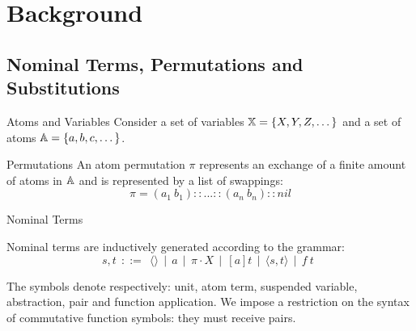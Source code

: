 \section{Background}
\subsection{Nominal Terms, Permutations and Substitutions}
\begin{frame}{Atoms and Variables} 
    Consider a set of variables $\mathbb{X} = \{X, Y, Z, \dots \}$ and 
    a set of atoms $\mathbb{A} = \{a, b, c, \dots \}$.
\end{frame}

\begin{frame}{Permutations}
    An atom permutation $\pi$ represents an exchange of a finite amount of atoms in
    $\mathbb{A}$
    and is represented by a list of swappings: 
\begin{equation*}
    \pi = (a_1 \ b_1):: ... ::(a_n \ b_n)::nil 
\end{equation*}
\end{frame}

\begin{frame}{Nominal Terms}
    \begin{definition}
    Nominal terms are inductively generated according to the grammar: 
    \begin{equation*}
        s,t \ \ ::= \ \ \langle \rangle \ \ | \ \ a \ \ | \ \ \pi \cdot X \ \ | \ \ [a]t \ \ |
                    \ \ \langle s, t \rangle \ \       | \ \ f \ t \ \   
    \end{equation*}
    \end{definition}
    The symbols denote respectively: unit, atom term, suspended variable,
    abstraction, pair and function application. 
    \newline
    We impose a restriction on the syntax
    of commutative function symbols: they must receive pairs. 
\end{frame}


